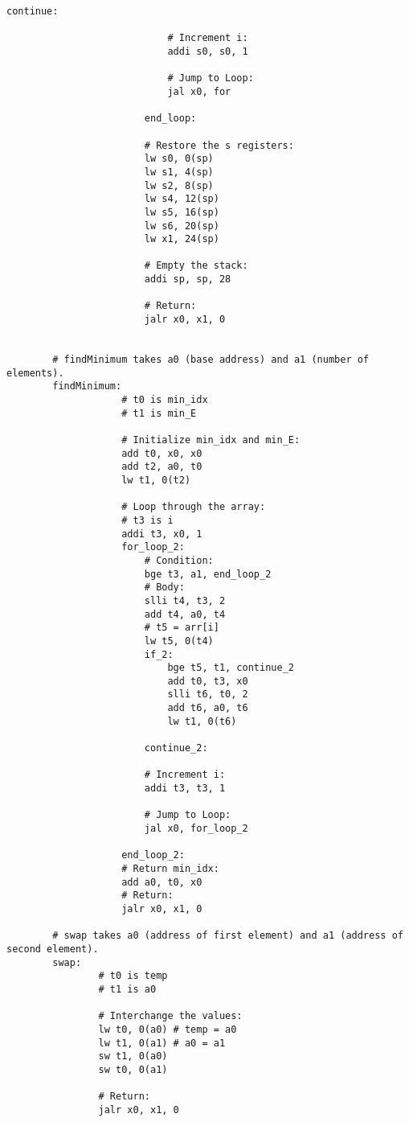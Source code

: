 \documentclass[12pt]{article}
\begin{document}
\begin{lstlisting}[language=RISCV]
                            continue:

                            # Increment i:
                            addi s0, s0, 1

                            # Jump to Loop:
                            jal x0, for 

                        end_loop:

                        # Restore the s registers:
                        lw s0, 0(sp)
                        lw s1, 4(sp)
                        lw s2, 8(sp)
                        lw s4, 12(sp)
                        lw s5, 16(sp)
                        lw s6, 20(sp)
                        lw x1, 24(sp)

                        # Empty the stack:
                        addi sp, sp, 28

                        # Return:
                        jalr x0, x1, 0


        # findMinimum takes a0 (base address) and a1 (number of elements).
        findMinimum:
                    # t0 is min_idx
                    # t1 is min_E

                    # Initialize min_idx and min_E:
                    add t0, x0, x0
                    add t2, a0, t0
                    lw t1, 0(t2)

                    # Loop through the array:
                    # t3 is i
                    addi t3, x0, 1
                    for_loop_2:
                        # Condition:
                        bge t3, a1, end_loop_2
                        # Body:
                        slli t4, t3, 2
                        add t4, a0, t4
                        # t5 = arr[i]
                        lw t5, 0(t4)
                        if_2:
                            bge t5, t1, continue_2
                            add t0, t3, x0
                            slli t6, t0, 2
                            add t6, a0, t6
                            lw t1, 0(t6)

                        continue_2:
                        
                        # Increment i:
                        addi t3, t3, 1

                        # Jump to Loop:
                        jal x0, for_loop_2
                    
                    end_loop_2:
                    # Return min_idx:
                    add a0, t0, x0
                    # Return:
                    jalr x0, x1, 0

        # swap takes a0 (address of first element) and a1 (address of second element).
        swap:
                # t0 is temp
                # t1 is a0
		
                # Interchange the values:
                lw t0, 0(a0) # temp = a0
                lw t1, 0(a1) # a0 = a1 
                sw t1, 0(a0)
                sw t0, 0(a1)
	
                # Return:
                jalr x0, x1, 0
    \end{lstlisting}
\end{document}
